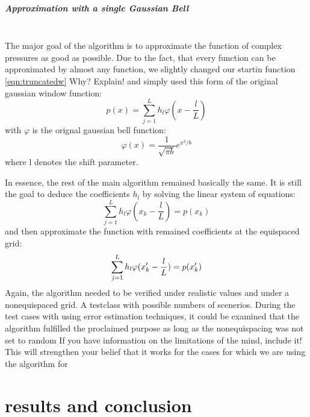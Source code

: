 \documentclass[11pt]{report} %
\begin{document}
\paragraph{Approximation with a single Gaussian Bell}  $ $ \\[1ex]
The major goal of the algorithm is to approximate the function of complex pressures as good as possible.
Due to the fact, that every function can be approximated by almost any function, we slightly changed our startin function \eqref{eqn:truncatedw} {\color{red} Why? Explain!} and simply used this form of the original gaussian window function: 
\begin{equation}
 p(x)=\sum\limits_{j=1}^L h_{l}\varphi(x-\frac{l}{L})
\end{equation}
with $\varphi$ is the orignal gaussian bell function: 
\begin{equation}
\varphi(x)= \frac{1}{\sqrt{\pi b}}  e^{x^2/b}
\end{equation}
where l denotes the shift parameter.

In essence, the rest of the main algorithm remained basically the same.
It is still the goal to deduce the coefficients $h_{l}$ by solving the linear system of equations: 
\begin{equation}
\sum\limits_{j=1}^L h_{l}\varphi(x_{k}-\frac{l}{L})=p(x_{k})
\end{equation}
and then approximate the function with remained coefficients at the equispaced grid: 
\begin{equation}
 \sum\limits_{j=1}^L h_{l}\varphi(x'_{k}-\frac{l}{L})=p(x'_{k})\notag
\end{equation}
Again, the algorithm needed to be verified under realistic values and under a nonequispaced grid. A testclass with possible numbers of scenerios. 
During the test cases with using error estimation techniques, it could be examined that the algorithm fulfilled the proclaimed purpose as long as the nonequispacing was not set to random {\color{red} If you have information on the limitations of the mind, include it! This will strengthen your belief that it works for the cases for which we are using the algorithm for}
\cite{Peter2011}
\cite{Mungur1969}
\printbibliography

\chapter{results and conclusion}
\end{document}
